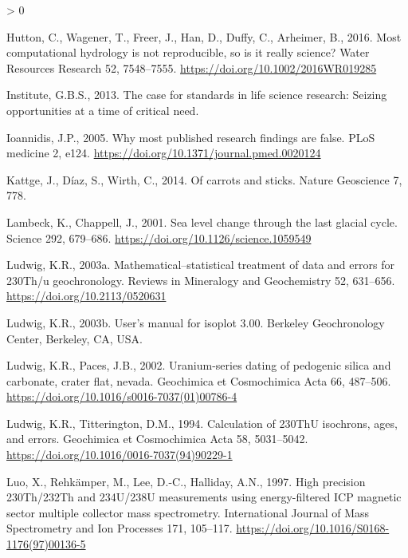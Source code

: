 \documentclass[]{elsarticle} %
\newlength{\cslhangindent}
\newenvironment{CSLReferences}[2] %
 {%
  \setlength{\parindent}{0pt}
  \ifodd #1 \everypar{\setlength{\hangindent}{\cslhangindent}}\ignorespaces\fi
  \ifnum #2 > 0
  \setlength{\parskip}{#2\baselineskip}
  \fi
 }%
 {}
\begin{document}
\begin{CSLReferences}{1}{0}
\leavevmode\hypertarget{ref-Hutton_et_al_2016}{}%
Hutton, C., Wagener, T., Freer, J., Han, D., Duffy, C., Arheimer, B., 2016. Most computational hydrology is not reproducible, so is it really science? Water Resources Research 52, 7548--7555. \url{https://doi.org/10.1002/2016WR019285}

\leavevmode\hypertarget{ref-global2013case}{}%
Institute, G.B.S., 2013. The case for standards in life science research: Seizing opportunities at a time of critical need.

\leavevmode\hypertarget{ref-ioannidis2005most}{}%
Ioannidis, J.P., 2005. Why most published research findings are false. PLoS medicine 2, e124. \url{https://doi.org/10.1371/journal.pmed.0020124}

\leavevmode\hypertarget{ref-Kattge_Diaz_Wirth_2014}{}%
Kattge, J., Díaz, S., Wirth, C., 2014. Of carrots and sticks. Nature Geoscience 7, 778.

\leavevmode\hypertarget{ref-RN510}{}%
Lambeck, K., Chappell, J., 2001. Sea level change through the last glacial cycle. Science 292, 679--686. \url{https://doi.org/10.1126/science.1059549}

\leavevmode\hypertarget{ref-RN4370}{}%
Ludwig, K.R., 2003a. Mathematical--statistical treatment of data and errors for 230Th/u geochronology. Reviews in Mineralogy and Geochemistry 52, 631--656. \url{https://doi.org/10.2113/0520631}

\leavevmode\hypertarget{ref-RN2163}{}%
Ludwig, K.R., 2003b. User's manual for isoplot 3.00. Berkeley Geochronology Center, Berkeley, CA, USA.

\leavevmode\hypertarget{ref-RN801}{}%
Ludwig, K.R., Paces, J.B., 2002. Uranium-series dating of pedogenic silica and carbonate, crater flat, nevada. Geochimica et Cosmochimica Acta 66, 487--506. \url{https://doi.org/10.1016/s0016-7037(01)00786-4}

\leavevmode\hypertarget{ref-RN2155}{}%
Ludwig, K.R., Titterington, D.M., 1994. Calculation of 230ThU isochrons, ages, and errors. Geochimica et Cosmochimica Acta 58, 5031--5042. \url{https://doi.org/10.1016/0016-7037(94)90229-1}

\leavevmode\hypertarget{ref-RN2951}{}%
Luo, X., Rehkämper, M., Lee, D.-C., Halliday, A.N., 1997. High precision 230Th/232Th and 234U/238U measurements using energy-filtered ICP magnetic sector multiple collector mass spectrometry. International Journal of Mass Spectrometry and Ion Processes 171, 105--117. \url{https://doi.org/10.1016/S0168-1176(97)00136-5}


\end{CSLReferences}
\end{document}
